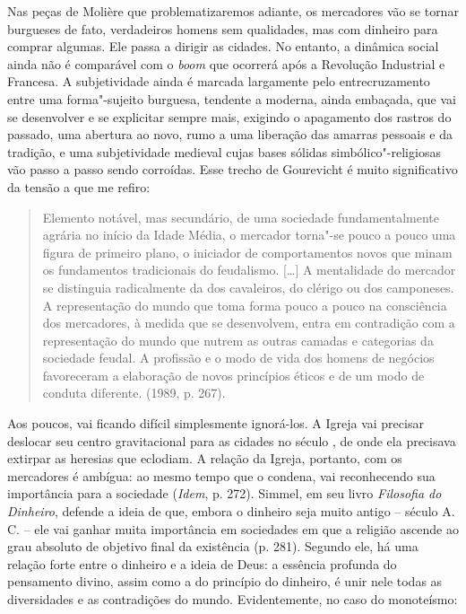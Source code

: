 Nas peças de Molière que problematizaremos adiante, os mercadores vão se
tornar burgueses de fato, verdadeiros homens sem qualidades, mas com
dinheiro para comprar algumas. Ele passa a dirigir as cidades. No
entanto, a dinâmica social ainda não é comparável com o \emph{boom} que
ocorrerá após a Revolução Industrial e Francesa. A subjetividade ainda é
marcada largamente pelo entrecruzamento entre uma forma"-sujeito
burguesa, tendente a moderna, ainda embaçada, que vai se desenvolver e
se explicitar sempre mais, exigindo o apagamento dos rastros do passado,
uma abertura ao novo, rumo a uma liberação das amarras pessoais e da
tradição, e uma subjetividade medieval cujas bases sólidas
simbólico"-religiosas vão passo a passo sendo corroídas. Esse trecho de
Gourevicht é muito significativo da tensão a que me refiro:

\begin{quote}
Elemento notável, mas secundário, de uma sociedade fundamentalmente
agrária no início da Idade Média, o mercador torna"-se pouco a pouco uma
figura de primeiro plano, o iniciador de comportamentos novos que minam
os fundamentos tradicionais do feudalismo. [\ldots{}] A mentalidade
do mercador se distinguia radicalmente da dos cavaleiros, do clérigo ou
dos camponeses. A representação do mundo que toma forma pouco a pouco na
consciência dos mercadores, à medida que se desenvolvem, entra em
contradição com a representação do mundo que nutrem as outras camadas e
categorias da sociedade feudal. A profissão e o modo de vida dos homens
de negócios favoreceram a elaboração de novos princípios éticos e de um
modo de conduta diferente. (1989, p. 267).
\end{quote}

Aos poucos, vai ficando difícil simplesmente ignorá-los. A Igreja vai
precisar deslocar seu centro gravitacional para as cidades no século
, de onde ela precisava extirpar as heresias que eclodiam. A relação
da Igreja, portanto, com os mercadores é ambígua: ao mesmo tempo que o
condena, vai reconhecendo sua importância para a sociedade (\emph{Idem},
p. 272). Simmel, em seu livro \emph{Filosofia do Dinheiro},
defende a ideia de que, embora o dinheiro seja muito antigo -- século
 A. C. -- ele vai ganhar muita importância em sociedades em que a
religião ascende ao grau absoluto de objetivo final da existência (p.
281). Segundo ele, há uma relação forte entre o dinheiro e a ideia de
Deus: a essência profunda do pensamento divino, assim como a do
princípio do dinheiro, é unir nele todas as diversidades e as
contradições do mundo. Evidentemente, no caso do monoteísmo:

